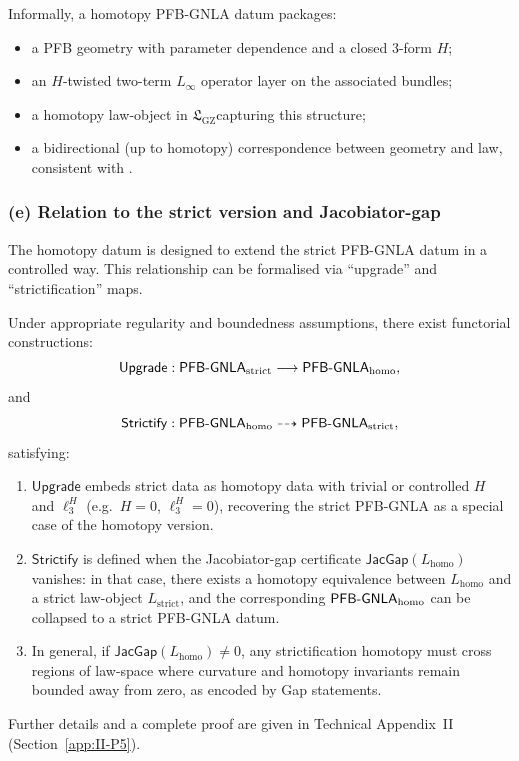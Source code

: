 \documentclass[11pt]{book}
\theoremstyle{plain}
\theoremstyle{definition}
\newcommand{\GZLS}{\ensuremath{\mathfrak{L}_{\mathrm{GZ}}}}       \newcommand{\GZLT}{\ensuremath{M_{!w}}}                           \newcommand{\GZLOC}{\ensuremath{A_M}}                             \newcommand{\GZLCurv}{\ensuremath{\mathcal{F}_{\mathrm{law}}}}
\begin{document}
Informally, a homotopy PFB-GNLA datum packages:

\begin{itemize}
  \item a PFB geometry with parameter dependence and a closed 3-form $H$;
  \item an $H$-twisted two-term $L_\infty$ operator layer on the
        associated bundles;
  \item a homotopy law-object in \GZLS capturing this structure;
  \item a bidirectional (up to homotopy) correspondence between
        geometry and law, consistent with \GZTLC.
\end{itemize}



\subsubsection*{(e) Relation to the strict version and Jacobiator-gap}

The homotopy datum is designed to extend the strict PFB-GNLA datum in a
controlled way. This relationship can be formalised via “upgrade” and
“strictification” maps.

\begin{proposition}
Under appropriate regularity and boundedness assumptions, there exist
  functorial constructions:
  \[
     \mathsf{Upgrade}:
       \mathsf{PFB\text- GNLA}_{\mathrm{strict}}
       \longrightarrow
       \mathsf{PFB\text- GNLA}_{\mathrm{homo}},
  \]
  and
  \[
     \mathsf{Strictify}:
       \mathsf{PFB\text- GNLA}_{\mathrm{homo}}
       \dashrightarrow
       \mathsf{PFB\text- GNLA}_{\mathrm{strict}},
  \]
  satisfying:
  \begin{enumerate}[label=\roman*)]
    \item $\mathsf{Upgrade}$ embeds strict data as homotopy data with
          trivial or controlled $H$ and $\ell_3^H$ (e.g.\ $H=0$,
          $\ell_3^H=0$), recovering the strict PFB-GNLA as a special
          case of the homotopy version.
    \item $\mathsf{Strictify}$ is defined when the Jacobiator-gap
          certificate $\mathsf{JacGap}(L_{\mathrm{homo}})$ vanishes:
          in that case, there exists a homotopy equivalence between
          $L_{\mathrm{homo}}$ and a strict law-object
          $L_{\mathrm{strict}}$, and the corresponding
          $\mathsf{PFB\text- GNLA}_{\mathrm{homo}}$ can be collapsed to
          a strict PFB-GNLA datum.
    \item In general, if $\mathsf{JacGap}(L_{\mathrm{homo}})\neq0$,
          any strictification homotopy must cross regions of law-space
          where curvature and homotopy invariants remain bounded away
          from zero, as encoded by Gap statements.
  \end{enumerate}
  Further details and a complete proof are given in Technical Appendix~II
  (Section~\ref{app:II-P5}).
\end{proposition}
\end{document}
